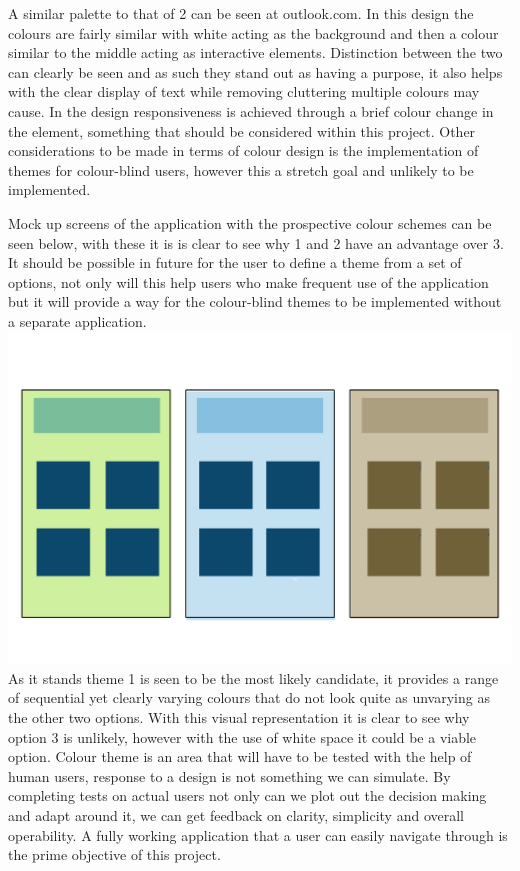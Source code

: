 A similar palette to that of 2 can be seen at outlook.com. In this design the colours are fairly similar with white acting as the background and then a colour similar to the middle acting as interactive elements. Distinction between the two can clearly be seen and as such they stand out as having a purpose, it also helps with the clear display of text while removing cluttering multiple colours may cause. In the design responsiveness is achieved through a brief colour change in the element, something that should be considered within this project. Other considerations to be made in terms of colour design is the implementation of themes for colour-blind users, however this a stretch goal and unlikely to be implemented. 

Mock up screens of the application with the prospective colour schemes can be seen below, with these it is is clear to see why 1 and 2 have an advantage over 3. It should be possible in future for the user to define a theme from a set of options, not only will this help users who make frequent use of the application but it will provide a way for the colour-blind themes to be implemented without a separate application. \\

\includegraphics[scale=0.7]{Chapter2/themes.png} 
As it stands theme 1 is seen to be the most likely candidate, it provides a range of sequential yet clearly varying colours that do not look quite as unvarying as the other two options. With this visual representation it is clear to see why option 3 is unlikely, however with the use of white space it could be a viable option. Colour theme is an area that will have to be tested with the help of human users, response to a design is not something we can simulate. By completing tests on actual users not only can we plot out the decision making and adapt around it, we can get feedback on clarity, simplicity and overall operability. A fully working application that a user can easily navigate through is the prime objective of this project. 
